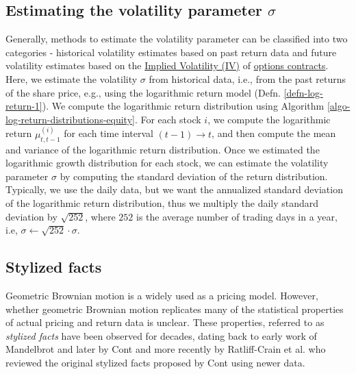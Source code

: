 \documentclass[11pt]{article}
\theoremstyle{definition}
\begin{document}
\subsection{Estimating the volatility parameter $\sigma$}
Generally, methods to estimate the volatility parameter can be classified into two categories - historical volatility estimates based on past return data and future volatility 
estimates based on the \href{https://en.wikipedia.org/wiki/Implied_volatility}{Implied Volatility (IV)} of \href{https://en.wikipedia.org/wiki/Option_(finance)}{options contracts}. 
Here, we estimate the volatility $\sigma$ from historical data, i.e., from the past returns of the share price, e.g., using the logarithmic return model (Defn. \ref{defn-log-return-1}).
We compute the logarithmic return distribution using Algorithm \ref{algo-log-return-distributions-equity}.
For each stock $i$, we compute the logarithmic return $\mu^{(i)}_{t,t-1}$ for each time interval $(t-1)\rightarrow{t}$, and then compute the mean and variance of the logarithmic return distribution.
Once we estimated the logarithmic growth distribution for each stock, we can estimate the volatility parameter $\sigma$ by computing the standard deviation of the return distribution.
Typically, we use the daily data, but we want the annualized standard deviation of the logarithmic return distribution, thus we multiply the daily standard deviation by $\sqrt{252}$, 
where $252$ is the average number of trading days in a year, i.e, $\sigma\leftarrow \sqrt{252}\cdot\sigma$.

\subsection{Stylized facts}
Geometric Brownian motion is a widely used as a pricing model. 
However, whether geometric Brownian motion replicates many of the statistical properties of actual pricing and return data is unclear. 
These properties, referred to as \textit{stylized facts} have been observed for decades, 
dating back to early work of Mandelbrot \cite{Mandelbrot-1963,Mandelbrot-1967} and later by Cont \cite{Cont-QuantFinance-2001} 
and more recently by Ratliff-Crain et al. \cite{ratliffcrain2023revisiting} who reviewed the original stylized facts 
proposed by Cont using newer data.
\end{document}
